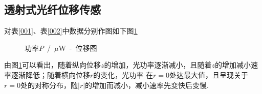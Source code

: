 \documentclass[a4paper]{article}%
\begin{document}
\subsection{透射式光纤位移传感}
对表\ref{001}、表\ref{002}中数据分别作图如下图\ref{00001}
\begin{figure}[H]%
  \centering%
  \quad
  \caption{功率$P$~/~$\mu$W~-~位移图}\label{00001}%
\end{figure}
由图\ref{00001}可以看出，随着纵向位移$z$的增加，光功率逐渐减小，且随着$z$的增加减小速率逐渐降低；随着横向位移$r$的变化，光功率
在$r=0$处达最大值，且呈现关于$r=0$处的对称分布，随$\left| r \right|$的增加而减小，减小速率先变快后变慢.
\end{document}

